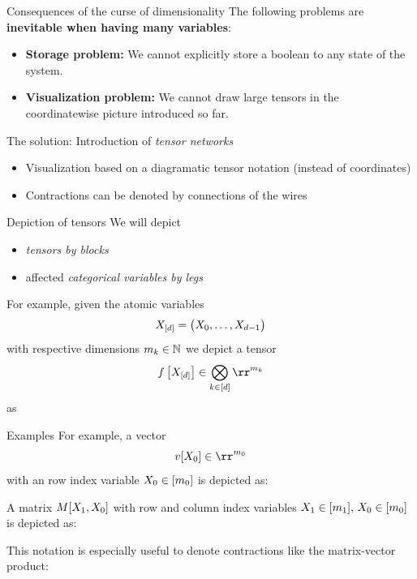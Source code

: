 \documentclass{beamer}
\begin{document}
    \begin{frame}{Consequences of the curse of dimensionality}
        The following problems are {\bf inevitable when having many variables}:
        \begin{itemize}
            \item {\bf Storage problem:} We cannot explicitly store a boolean to any state of the system.
            \item {\bf Visualization problem:} We cannot draw large tensors in the coordinatewise picture introduced so far.
        \end{itemize}

        \medskip

        The solution: Introduction of \emph{tensor networks}
        \begin{itemize}
            \item Visualization based on a diagramatic tensor notation (instead of coordinates)
            \item Contractions can be denoted by connections of the wires
        \end{itemize}
    \end{frame}

    \begin{frame}{Depiction of tensors}
        We will depict
        \begin{itemize}
            \item \emph{tensors by blocks}
            \item affected \emph{categorical variables by legs}
        \end{itemize}
        For example, given the atomic variables
        \[ X_{[d]} = \big(X_{0},\ldots,X_{d-1}\big) \]
        with respective dimensions $m_{k}\in\mathbb{N}$ we depict a tensor
        \[ \formulawith \in \bigotimes_{\atomenumeratorin} \rr^{\catdimof{\atomenumerator}} \]
        as
        \begin{center}
            
        \end{center}
    \end{frame}

    \begin{frame}{Examples}
        For example, a vector
        \[ v[\catvariableof{0}] \in \rr^{\catdimof{0}}\]
        with an row index variable $X_{0}\in[m_{0}]$ is depicted as:
        \begin{center}
            
        \end{center}
        A matrix $M[X_{1},X_{0}]$ with row and column index variables $X_{1}\in[m_{1}],\,X_{0}\in[m_{0}]$ is depicted as:
        \begin{center}
            
        \end{center}
        This notation is especially useful to denote contractions like the matrix-vector product:
        \begin{center}
            
        \end{center}
    \end{frame}
\end{document}
